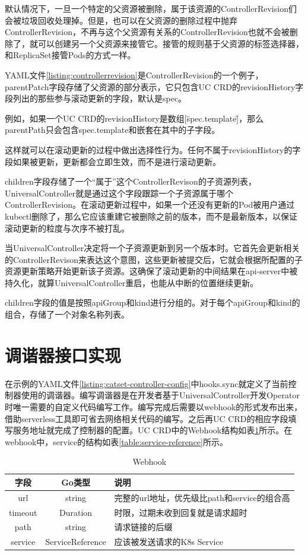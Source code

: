 \documentclass[macfonts,master]{njuthesis}
\begin{document}
默认情况下，一旦一个特定的父资源被删除，属于该资源的ControllerRevision们会被垃圾回收处理掉。但是，也可以在父资源的删除过程中抛弃ControllerRevision，不再与这个父资源有关系的ControllerRevision也就不会被删除了，就可以创建另一个父资源来接管它。接管的规则基于父资源的标签选择器，和ReplicaSet接管Pods的方式一样。

YAML文件\ref{listing:controllerrevision}是ControllerRevision的一个例子，parentPatch字段存储了父资源的部分表示，它只包含UC CRD的revisionHistory字段列出的那些参与滚动更新的字段，默认是spec。

例如，如果一个UC CRD的revisionHistory是数组[\"spec.template\"]，那么parentPath只会包含spec.template和嵌套在其中的子字段。

这样就可以在滚动更新的过程中做出选择性行为。任何不属于revisionHistory的字段如果被更新，更新都会立即生效，而不是进行滚动更新。

children字段存储了一个``属于''这个ControllerRevison的子资源列表，UniversalController就是通过这个字段跟踪一个子资源属于哪个ControllerRevision。在滚动更新过程中，如果一个还没有更新的Pod被用户通过kubectl删除了，那么它应该重建它被删除之前的版本，而不是最新版本，以保证滚动更新的粒度与次序不被打乱。

当UniversalController决定将一个子资源更新到另一个版本时。它首先会更新相关的ControllerRevison来表达这个意图，这些更新被提交后，它就会根据所配置的子资源更新策略开始更新该子资源。这确保了滚动更新的中间结果在api-server中被持久化，就算UniversalController重启，也能从中断的位置继续更新。

children字段的值是按照apiGroup和kind进行分组的。对于每个apiGroup和kind的组合，存储了一个对象名称列表。
\section{调谐器接口实现}
在示例的YAML文件\ref{listing:catset-controller-config}中hooks.sync就定义了当前控制器使用的调谐器。编写调谐器是在开发者基于UniversalController开发Operator时唯一需要的自定义代码编写工作。编写完成后需要以webhook的形式发布出来，借助serverless工具即可省去网络相关代码的编写。之后再UC CRD的相应字段填写服务地址就完成了控制器的配置。UC CRD中的Webhook结构如表\ref{table:webhook}所示。在webhook中，service的结构如表\ref{table:service-reference}所示。

\begin{table}
  \centering
  \begin{tabular}{ccp{50mm}}
    \toprule
    \textbf{字段} & \textbf{Go类型} & \textbf{说明} \\
    \midrule
    url  & string  & 完整的url地址，优先级比path和service的组合高\\
    timeout  & Duration   &  时限，过期未收到回复就是请求超时 \\
    path     & string  &  请求链接的后缀 \\
    service    & ServiceReference   &  应该被发送请求的K8s Service \\
    \bottomrule
  \end{tabular}
  \caption{Webhook}\label{table:webhook}
\end{table}
\end{document}
